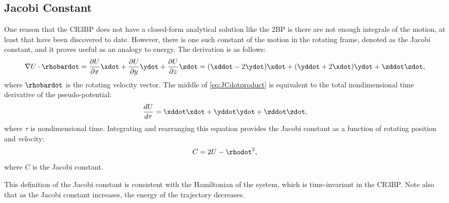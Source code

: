 \subsection{Jacobi Constant}
One reason that the CR3BP does not have a closed-form analytical solution like the 2BP is there are
not enough integrals of the motion, at least that have been discovered to date. However, there is
one such constant of the motion in the rotating frame, denoted as the Jacobi constant, and it
proves useful as an analogy to energy. The derivation is as follows\cite{Zimovan:2017}:
\begin{equation}
    \nabla U\cdot\rhobardot=\frac{\partial U}{\partial x}\xdot+\frac{\partial U}{\partial y}\ydot+\frac{\partial U}{\partial z}\zdot=(\xddot-2\ydot)\xdot+(\yddot+2\xdot)\ydot+\zddot\zdot,
    \label{eq:JCdotproduct}
\end{equation}
where $\rhobardot$ is the rotating velocity vector. The middle of \cref{eq:JCdotproduct} is
equivalent to the total nondimensional time derivative of the pseudo-potential:
\begin{equation}
    \frac{dU}{d\tau}=\xddot\xdot+\yddot\ydot+\zddot\zdot,
    \label{eq:JCtimeder}
\end{equation}
where $\tau$ is nondimensional time. Integrating and rearranging this equation provides the Jacobi
constant as a function of rotating position and velocity:
\begin{equation}
    C=2U-\rhodot^{2},
    \label{eq:JC}
\end{equation}
where $C$ is the Jacobi constant.

This definition of the Jacobi constant is consistent with the Hamiltonian of the system, which is
time-invariant in the CR3BP\cite{Boudad:2022}. Note also that as the Jacobi constant increases, the
energy of the trajectory decreases.
